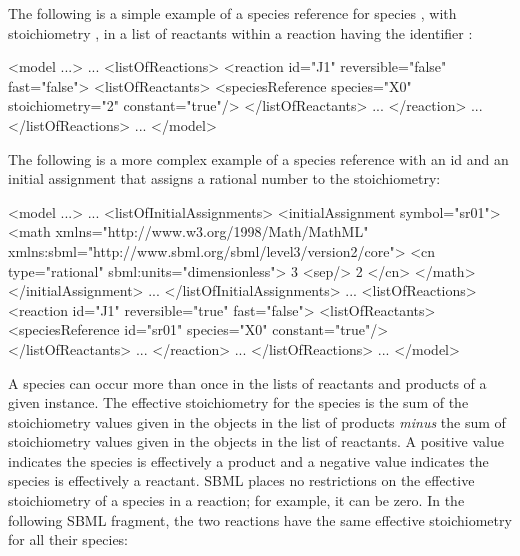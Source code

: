 The following is a simple example of a species reference for
species , with stoichiometry , in a list of
reactants within a reaction having the identifier :

\begin{example}
<model ...>
    ...
    <listOfReactions>
        <reaction id="J1" reversible="false" fast="false">
            <listOfReactants>
                <speciesReference species="X0" stoichiometry="2" constant="true"/>
            </listOfReactants>
            ...
        </reaction>
        ...
    </listOfReactions>
    ...
</model>
\end{example}

The following is a more complex example of a species reference
with an id  and an initial assignment that assigns a
rational number to the stoichiometry:

\begin{example}
<model ...>
    ...
    <listOfInitialAssignments>
        <initialAssignment symbol="sr01">
            <math xmlns="http://www.w3.org/1998/Math/MathML"
                  xmlns:sbml="http://www.sbml.org/sbml/level3/version2/core">
                <cn type="rational" sbml:units="dimensionless"> 3 <sep/> 2 </cn>
            </math>
        </initialAssignment>
        ...
    </listOfInitialAssignments>
        ...
    <listOfReactions>
        <reaction id="J1" reversible="true" fast="false">
            <listOfReactants>
                <speciesReference id="sr01" species="X0" constant="true"/>
            </listOfReactants>
            ...
        </reaction>
        ...
    </listOfReactions>
    ...
</model>
\end{example}


A species can occur more than once in the lists of reactants and
products of a given \Reaction instance.  The effective
stoichiometry for the species is the sum of the stoichiometry
values given in the \SpeciesReference objects in the list of
products \emph{minus} the sum of stoichiometry values given in the
\SpeciesReference objects in the list of reactants.  A positive
value indicates the species is effectively a product and a
negative value indicates the species is effectively a reactant.
SBML places no restrictions on the effective stoichiometry of a
species in a reaction; for example, it can be zero.  In the
following SBML fragment, the two reactions have the same effective
stoichiometry for all their species:

